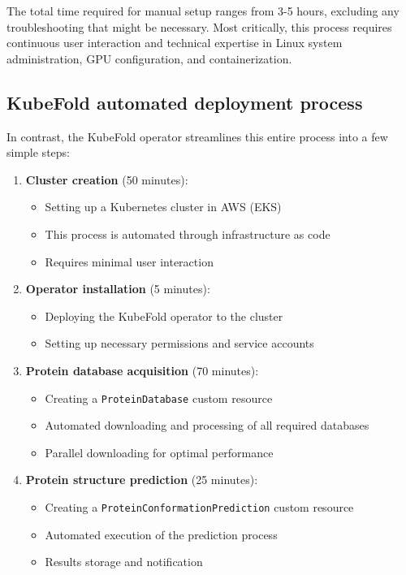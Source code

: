 The total time required for manual setup ranges from 3-5 hours, excluding any troubleshooting that might be necessary. Most critically, this process requires continuous user interaction and technical expertise in Linux system administration, GPU configuration, and containerization.

\subsection{KubeFold automated deployment process}

In contrast, the KubeFold operator streamlines this entire process into a few simple steps:

\begin{enumerate}
    \item \textbf{Cluster creation} (50 minutes):
    \begin{itemize}
        \item Setting up a Kubernetes cluster in AWS (EKS)
        \item This process is automated through infrastructure as code
        \item Requires minimal user interaction
    \end{itemize}
    
    \item \textbf{Operator installation} (5 minutes):
    \begin{itemize}
        \item Deploying the KubeFold operator to the cluster
        \item Setting up necessary permissions and service accounts
    \end{itemize}
    
    \item \textbf{Protein database acquisition} (70 minutes):
    \begin{itemize}
        \item Creating a \texttt{ProteinDatabase} custom resource
        \item Automated downloading and processing of all required databases
        \item Parallel downloading for optimal performance
    \end{itemize}
    
    \item \textbf{Protein structure prediction} (25 minutes):
    \begin{itemize}
        \item Creating a \texttt{ProteinConformationPrediction} custom resource
        \item Automated execution of the prediction process
        \item Results storage and notification
    \end{itemize}
\end{enumerate}

